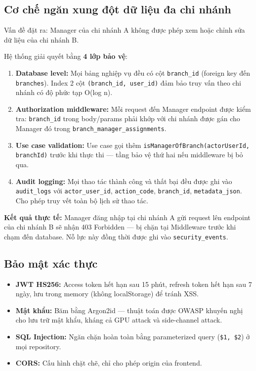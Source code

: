 \subsection{Cơ chế ngăn xung đột dữ liệu đa chi nhánh}
Vấn đề đặt ra: Manager của chi nhánh A không được phép xem hoặc chỉnh sửa dữ liệu của chi nhánh B.

Hệ thống giải quyết bằng \textbf{4 lớp bảo vệ}:

\begin{enumerate}
    \item \textbf{Database level:} Mọi bảng nghiệp vụ đều có cột \texttt{branch\_id} (foreign key đến \texttt{branches}). Index 2 cột \texttt{(branch\_id, user\_id)} đảm bảo truy vấn theo chi nhánh có độ phức tạp O(log n).
    \item \textbf{Authorization middleware:} Mỗi request đến Manager endpoint được kiểm tra: \texttt{branch\_id} trong body/params phải khớp với chi nhánh được gán cho Manager đó trong \texttt{branch\_manager\_assignments}.
    \item \textbf{Use case validation:} Use case gọi thêm \texttt{isManagerOfBranch(actorUserId, branchId)} trước khi thực thi — tầng bảo vệ thứ hai nếu middleware bị bỏ qua.
    \item \textbf{Audit logging:} Mọi thao tác thành công và thất bại đều được ghi vào \texttt{audit\_logs} với \texttt{actor\_user\_id}, \texttt{action\_code}, \texttt{branch\_id}, \texttt{metadata\_json}. Cho phép truy vết toàn bộ lịch sử thao tác.
\end{enumerate}

\textbf{Kết quả thực tế:} Manager đăng nhập tại chi nhánh A gửi request lên endpoint của chi nhánh B sẽ nhận 403 Forbidden — bị chặn tại Middleware trước khi chạm đến database. Nỗ lực này đồng thời được ghi vào \texttt{security\_events}.

\subsection{Bảo mật xác thực}
\begin{itemize}
    \item \textbf{JWT HS256:} Access token hết hạn sau 15 phút, refresh token hết hạn sau 7 ngày, lưu trong memory (không localStorage) để tránh XSS.
    \item \textbf{Mật khẩu:} Băm bằng Argon2id — thuật toán được OWASP khuyến nghị cho lưu trữ mật khẩu, kháng cả GPU attack và side-channel attack.
    \item \textbf{SQL Injection:} Ngăn chặn hoàn toàn bằng parameterized query (\texttt{\$1, \$2}) ở mọi repository.
    \item \textbf{CORS:} Cấu hình chặt chẽ, chỉ cho phép origin của frontend.
\end{itemize}

